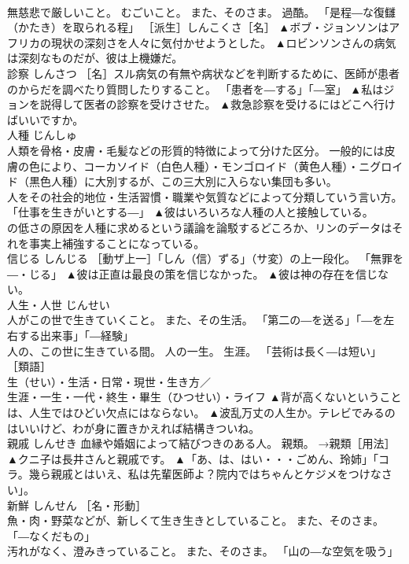 \documentclass[8pt]{extreport}
\begin{document}
\begin{CJK}{UTF8}{min}
\\	無慈悲で厳しいこと。 むごいこと。 また、そのさま。 過酷。 「是程―な復讎（かたき）を取られる程」 ［派生］しんこくさ［名］	▲ボブ・ジョンソンはアフリカの現状の深刻さを人々に気付かせようとした。 ▲ロビンソンさんの病気は深刻なものだが、彼は上機嫌だ。
\\	診察	しんさつ	［名］スル病気の有無や病状などを判断するために、医師が患者のからだを調べたり質問したりすること。 「患者を―する」「―室」	▲私はジョンを説得して医者の診察を受けさせた。 ▲救急診察を受けるにはどこへ行けばいいですか。
\\	人種	じんしゅ	
\\	人類を骨格・皮膚・毛髪などの形質的特徴によって分けた区分。 一般的には皮膚の色により、コーカソイド（白色人種）・モンゴロイド（黄色人種）・ニグロイド（黒色人種）に大別するが、この三大別に入らない集団も多い。 
\\	人をその社会的地位・生活習慣・職業や気質などによって分類していう言い方。 「仕事を生きがいとする―」	▲彼はいろいろな人種の人と接触している。 
\\	の低さの原因を人種に求めるという議論を論駁するどころか、リンのデータはそれを事実上補強することになっている。
\\	信じる	しんじる	［動ザ上一］「しん（信）ずる」（サ変）の上一段化。 「無罪を―・じる」	▲彼は正直は最良の策を信じなかった。 ▲彼は神の存在を信じない。
\\	人生・人世	じんせい	
\\	人がこの世で生きていくこと。 また、その生活。 「第二の―を送る」「―を左右する出来事」「―経験」 
\\	人の、この世に生きている間。 人の一生。 生涯。 「芸術は長く―は短い」 ［類語］
\\	生（せい）・生活・日常・現世・生き方／
\\	生涯・一生・一代・終生・畢生（ひつせい）・ライフ	▲背が高くないということは、人生ではひどい欠点にはならない。 ▲波乱万丈の人生か。テレビでみるのはいいけど、わが身に置きかえれば結構きついね。
\\	親戚	しんせき	血縁や婚姻によって結びつきのある人。 親類。 →親類［用法］	▲クニ子は長井さんと親戚です。 ▲「あ、は、はい・・・ごめん、玲姉」「コラ。幾ら親戚とはいえ、私は先輩医師よ？院内ではちゃんとケジメをつけなさい」。
\\	新鮮	しんせん	［名・形動］ 
\\	魚・肉・野菜などが、新しくて生き生きとしていること。 また、そのさま。 「―なくだもの」 
\\	汚れがなく、澄みきっていること。 また、そのさま。 「山の―な空気を吸う」 

\end{CJK}
\end{document}
